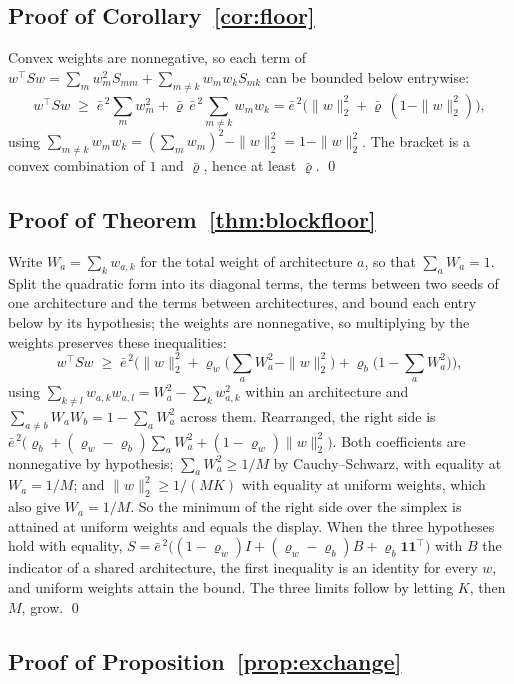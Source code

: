 \subsection{Proof of Corollary~\ref{cor:floor}}
\label{proof:cor:floor}

Convex weights are nonnegative, so each term of
$w^\top Sw=\sum_{m}w_m^2S_{mm}+\sum_{m\neq k}w_mw_kS_{mk}$ can be bounded
below entrywise:
\[
w^\top Sw\;\ge\;\bar e^{\,2}\sum_m w_m^2+\bar\varrho\,\bar
e^{\,2}\sum_{m\neq k}w_mw_k
=\bar e^{\,2}\Big(\|w\|_2^2+\bar\varrho\,(1-\|w\|_2^2)\Big),
\]
using $\sum_{m\neq k}w_mw_k=(\sum_m w_m)^2-\|w\|_2^2=1-\|w\|_2^2$. The bracket
is a convex combination of $1$ and $\bar\varrho$, hence at least
$\bar\varrho$. \qed

\subsection{Proof of Theorem~\ref{thm:blockfloor}}
\label{proof:thm:blockfloor}

Write $W_a=\sum_kw_{a,k}$ for the total weight of architecture $a$, so that
$\sum_aW_a=1$. Split the quadratic form into its diagonal terms, the terms
between two seeds of one architecture and the terms between architectures,
and bound each entry below by its hypothesis; the weights are nonnegative,
so multiplying by the weights preserves these inequalities:
\[
w^\top Sw\;\ge\;\bar e^{\,2}\Big(\|w\|_2^2
+\varrho_w\big(\textstyle\sum_aW_a^2-\|w\|_2^2\big)
+\varrho_b\big(1-\sum_aW_a^2\big)\Big),
\]
using $\sum_{k\ne l}w_{a,k}w_{a,l}=W_a^2-\sum_kw_{a,k}^2$ within an
architecture and $\sum_{a\ne b}W_aW_b=1-\sum_aW_a^2$ across them.
Rearranged, the right side is
$\bar e^{\,2}\big(\varrho_b+(\varrho_w-\varrho_b)\sum_aW_a^2
+(1-\varrho_w)\|w\|_2^2\big)$. Both coefficients are nonnegative by
hypothesis; $\sum_aW_a^2\ge1/M$ by Cauchy--Schwarz, with equality at
$W_a=1/M$; and $\|w\|_2^2\ge1/(MK)$ with equality at uniform weights, which
also give $W_a=1/M$. So the minimum of the right side over the simplex is
attained at uniform weights and equals the display. When the three
hypotheses hold with equality,
$S=\bar e^{\,2}\big((1-\varrho_w)I+(\varrho_w-\varrho_b)B
+\varrho_b\mathbf 1\mathbf 1^\top\big)$ with $B$ the indicator of a shared
architecture, the first inequality is an identity for every $w$, and uniform
weights attain the bound. The three limits follow by letting $K$, then $M$,
grow. \qed

\subsection{Proof of Proposition~\ref{prop:exchange}}
\label{proof:prop:exchange}

